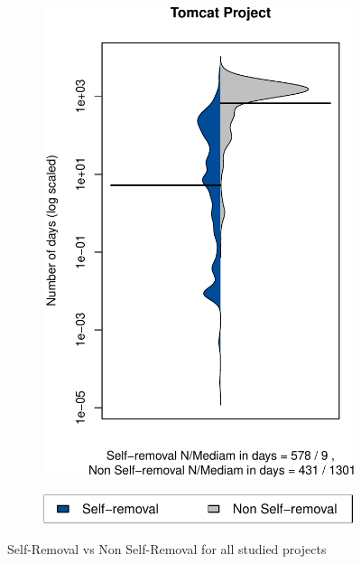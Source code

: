 \begin{figure}[t]
\begin{subfigure}[b]{0.195\textwidth}
		\includegraphics[width=\textwidth]{figures/test/Tomcat.pdf}
		\label{fig:removal_comparison_tomcat} 
	\end{subfigure}
	\begin{subfigure}[b]{0.30\textwidth}
		\includegraphics[width=\textwidth]{figures/test/legend.pdf}
	\end{subfigure}
	\caption{Self-Removal vs Non Self-Removal for all studied projects}
	\label{fig:removal_self_vs_nonself}
\end{figure}


